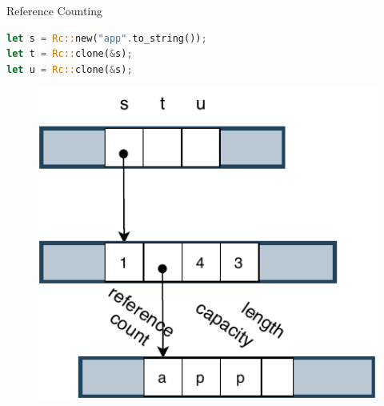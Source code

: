 \documentclass[9pt]{beamer}
\begin{document}

\begin{frame}[t, fragile]{Reference Counting}
\vspace{-0.5cm}
\begin{minipage}{0.7\linewidth}
\begin{lstlisting}[language=Rust]
let s = Rc::new("app".to_string());
let t = Rc::clone(&s);
let u = Rc::clone(&s); 
\end{lstlisting}
\end{minipage}     

    \begin{minipage}{0.3\linewidth}
        \begin{figure}[hp]
            \centering
            \begin{center}
                    \includegraphics[width=1.0\textwidth]{images/rc1.pdf}
                    \captionsetup{labelformat=empty}
            \end{center}
            

\end{figure}
\end{minipage}
\end{frame}
\end{document}

